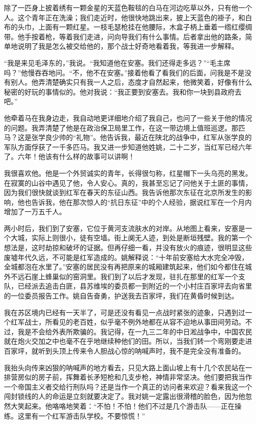 \documentclass[10pt]{book}
\begin{document}
除了一匹身上披着绣有一颗金星的天蓝色鞍毯的白马在河边吃草以外，只有他一个人。这个青年正在洗澡；我们走近时，他很快地跳出来，披上天蓝色的褂子，和白布的头巾，上面有一颗红星。一枝毛瑟枪挂在他腰际，木盒子柄上垂着一绺红缨绸带。他手按着枪，等着我们走进，问向导我们有什么事情。后者拿出他的路条，简单地说明了我是怎么被交给他的，那个战士好奇地看着我，等我进一步解释。

“我是来见毛泽东的，”我说。“我知道他在安塞。我们还得走多远？”“毛主席吗？”他慢吞吞地问。“不，他不在安塞。”接着他看了看我们的后面，问我是不是没有别人。他弄清楚确实只有我一人之后，态度才自然起来，他微笑着，好像有什么秘密的好玩的事情似的。他对我说：“我正要到安塞去。我和你一块到县政府去吧。”

他牵着马在我身边走，我自动地更详细地介绍了我自己，也问了一些关于他的情况的问题。我弄清楚了他是在政治保卫局里工作，在这一带边境上值班巡逻。那匹马？这是张学良少帅的“礼物”。他告诉我，最近在陕北的战争中，红军从张学良的军队方面俘获了一千多匹马。我又进一步知道他姓姚，二十二岁，当红军已经六年了。六年！他该有什么样的故事可以讲啊！

我很喜欢他。他是一个外贸诚实的青年，长得很匀称，红星帽下一头乌亮的黑发。在寂寞的山谷中遇见了他，令人安心。真的，我甚至忘记了问他关于土匪的事情，因为我们很快就谈到红军在春天的东征山西。我告诉他那次东征在北京所发生的影响，他也告诉我，他在那次惊人的“抗日东征”中的个人经验，据说红军在一个月内增加了一万五千人。

两小时后，我们到了安塞，它位于黄河支流肤水的对岸。从地图上看来，安塞是一个大城，实际上则很小，徒有空墙。街上阒无人迹，到处是断垣残壁。我的第一个想法是，这时劫掠和破坏的证据。但再仔细一看，并没有放火的痕迹，很明显这些废墟年代久远，不可能是红军造成的。姚解释说：“十年前安塞给大水完全冲毁，全城都泡在水里了。”安塞的居民没有再把原来的城厢建筑起来，他们如今都住在城外不远石崖上蜂巢似的窑洞里。我们到了以后才发现，驻扎在那里的红军一个支队，已经派去追击白匪，县苏维埃的委员都一到附近的一个小村庄百家坪去向省里的一位委员报告工作。姚自告奋勇，护送我去百家坪，我们在黄昏时候到达。

我在苏区境内已经有一天半了，可是还没有看见一点战时紧张的迹象，只遇到过一个红军战士，所看见的老百姓，似乎毫不例外地都在从容不迫地从事田间劳动。不过，我是不会给外表所欺骗的。我记得，在一九三二年的中日淞战争中，中国农民就在炮火交加之中也毫不在乎地继续种他们的田。所以，当我们转一个弯刚要走进百家坪，就听到头顶上传来令人胆战心惊的呐喊声时，我不是完全没有准备的。

我抬头向传来凶狠的呐喊声的地方看去，只见大路上面山坡上有十几个农民站在一排营房似的房子前，挥舞着长矛短枪和几支步枪，神情非常坚决。他们要把我当作一个帝国主义者交给行刑队吗？还是当作一个真正的访问者来欢迎？看来我这一个闯封锁线的人的命运是立刻就要决定了。我对姚一定露出很滑稽的脸色，因为他忽然大笑起来。他咯咯地笑着：“不怕！不怕！他们不过是几个游击队——正在操练。这里有一个红军游击队学校。不要惊慌！”
\end{document}
